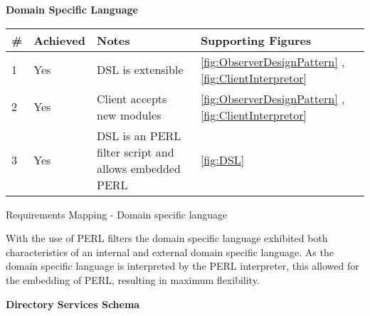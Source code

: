 	\vspace{5mm}
	\large{\bfseries{Domain Specific Language}}
	\vspace{4mm}
	
	\begin{tablehere}
	
		\small{\begin{tabular}{ | p{5mm} | p{16mm} | p{100mm} | p{16mm} |}
		\hline
		\textbf{\#}							& \textbf{Achieved} 	& \textbf{Notes} 																			& \textbf{Supporting Figures}													\\ \hline
		1	 	 	 						& Yes					& DSL is extensible																			& \ref{fig:ObserverDesignPattern} , \ref{fig:ClientInterpretor}					\\ \hline
		2	 	 	 						& Yes					& Client accepts new modules																& \ref{fig:ObserverDesignPattern} , \ref{fig:ClientInterpretor}					\\ \hline
		3	 	 	 						& Yes 					& DSL is an PERL filter script and allows embedded PERL										& \ref{fig:DSL}																	\\ \hline
		
		\end{tabular}}
		
		\caption{Requirements Mapping - Domain specific language}
		\label{tab:RequirementsMappingDomainspecificlanguage}
	
	\end{tablehere}
	
	\vspace{5mm}
	\normalsize
	{
		With the use of PERL filters the domain specific language exhibited both characteristics of an internal and external domain specific language.
		As the domain specific language is interpreted by the PERL interpreter, this allowed for the embedding of PERL, resulting in maximum flexibility.
	}
	
\newpage
	
	\vspace{5mm}
	\large{\bfseries{Directory Services Schema}}
	\vspace{4mm}
	

